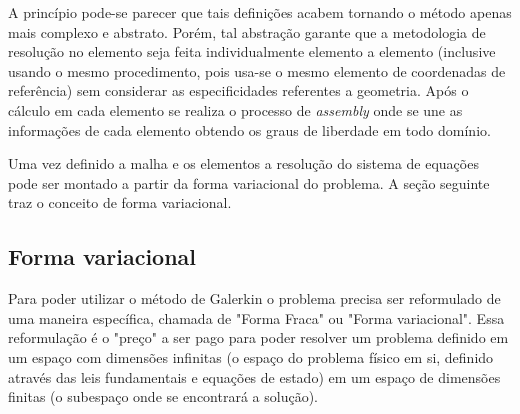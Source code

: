     A princípio pode-se parecer que tais definições acabem tornando o método apenas mais complexo e abstrato. Porém, tal abstração garante que a  metodologia de resolução no elemento seja feita individualmente elemento a elemento (inclusive usando o mesmo procedimento, pois usa-se o mesmo elemento de coordenadas de referência) sem considerar as especificidades referentes a geometria. Após o cálculo em cada elemento se realiza o processo de \textit{assembly} onde se une as informações de cada elemento obtendo os graus de liberdade em todo domínio.
    
    Uma vez definido a malha e os elementos a resolução do sistema de equações  pode ser montado a partir da forma variacional do problema. A seção seguinte traz o conceito de forma variacional.

    \subsection{Forma variacional}
    Para poder utilizar o método de Galerkin o problema precisa ser reformulado de uma maneira específica, chamada de "Forma Fraca" ou "Forma variacional". Essa reformulação é o "preço" a ser pago para poder resolver um problema definido em um espaço com dimensões infinitas (o espaço do problema físico em si, definido através das leis fundamentais e equações de estado) em um espaço de dimensões finitas (o subespaço onde se encontrará a solução).
    

